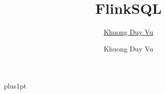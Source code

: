 \documentclass[twoside,12pt]{Latex/Classes/PhDthesisPSnPDF}
\title{FlinkSQL}
\author{\href{mailto:duyvkvn@gmail.com}{Khuong Duy Vu}}
\author{Khuong Duy Vu}
\begin{document}

\renewcommand\baselinestretch{1.2}
\renewcommand*\listfigurename{Danh sách hình vẽ}
\renewcommand*\listtablename{Danh sách bảng}
\renewcommand*\figurename{Hình}
\renewcommand*\contentsname{Mục lục}
\renewcommand*\tablename{Bảng}
\baselineskip=18pt plus1pt



\maketitle  %













%   



%




\end{document}
